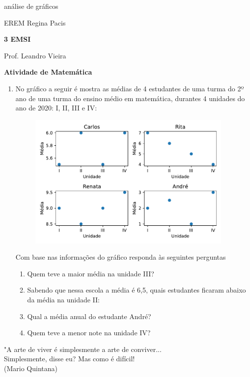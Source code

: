 \documentclass[twocolumn, oneside,a4paper,10pt]{article}
\newcommand{\EREM}{EREM Regina Pacis}
\newcommand{\curso}{\textbf{3 EMSI}}
\newcommand{\professor}{Prof. Leandro Vieira}
\begin{document}
\pagestyle{empty}
análise de gráficos

\begin{center}
\EREM
\par %
\curso
\par
\professor
\par
\LARGE \textbf{Atividade de Matemática}
\end{center}

\begin{enumerate}

\item No gráfico a seguir é mostra as médias de 4 estudantes de uma turma do 2º ano de uma turma do ensino médio em matemática, durantes 4 unidades do ano de 2020: I, II, III e IV:

\begin{figure}[h]
\center
\includegraphics[width=10cm]{Figuras/01}
\end{figure}

\noindent Com base nas informações do gráfico responda às seguintes perguntas

	\begin{enumerate}
	\item Quem teve a maior média na unidade III?
	\item Sabendo que nessa escola a média é 6,5, quais estudantes ficaram abaixo da média na unidade II:
	\item Qual a média anual do estudante André?
	\item Quem teve a menor note na unidade IV?
	\end{enumerate}


\end{enumerate}

\flushbottom 
\flushright
"A arte de viver é simplesmente a arte de conviver...\\Simplesmente, disse eu? Mas como é difícil!\\(Mario Quintana)
\end{document}
